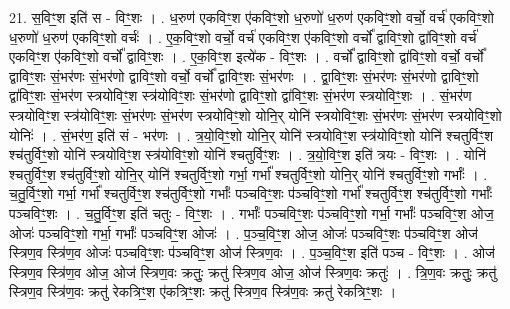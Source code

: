 \documentclass[17pt]{extarticle}
\begin{document}
21. स॒विꣳ॒॒श इति॑ स - विꣳ॒॒शः । . ध॒रुण॑ एकविꣳ॒॒श ए॑कविꣳ॒॒शो ध॒रुणो॑ ध॒रुण॑ एकविꣳ॒॒शो वर्चो॒ वर्च॑ एकविꣳ॒॒शो ध॒रुणो॑ ध॒रुण॑ एकविꣳ॒॒शो वर्चः॑ । . ए॒क॒विꣳ॒॒शो वर्चो॒ वर्च॑ एकविꣳ॒॒श ए॑कविꣳ॒॒शो वर्चो᳚ द्वाविꣳ॒॒शो द्वा॑विꣳ॒॒शो वर्च॑ एकविꣳ॒॒श ए॑कविꣳ॒॒शो वर्चो᳚ द्वाविꣳ॒॒शः । . ए॒क॒विꣳ॒॒श इत्ये॑क - विꣳ॒॒शः । . वर्चो᳚ द्वाविꣳ॒॒शो द्वा॑विꣳ॒॒शो वर्चो॒ वर्चो᳚ द्वाविꣳ॒॒शः सं॒भर॑णः सं॒भर॑णो द्वाविꣳ॒॒शो वर्चो॒ वर्चो᳚ द्वाविꣳ॒॒शः सं॒भर॑णः । . द्वा॒विꣳ॒॒शः सं॒भर॑णः सं॒भर॑णो द्वाविꣳ॒॒शो द्वा॑विꣳ॒॒शः सं॒भर॑ण स्त्रयोविꣳ॒॒श स्त्र॑योविꣳ॒॒शः सं॒भर॑णो द्वाविꣳ॒॒शो द्वा॑विꣳ॒॒शः सं॒भर॑ण स्त्रयोविꣳ॒॒शः । . सं॒भर॑ण स्त्रयोविꣳ॒॒श स्त्र॑योविꣳ॒॒शः सं॒भर॑णः सं॒भर॑ण स्त्रयोविꣳ॒॒शो योनि॒र् योनि॑ स्त्रयोविꣳ॒॒शः सं॒भर॑णः सं॒भर॑ण स्त्रयोविꣳ॒॒शो योनिः॑ । . सं॒भर॑ण॒ इति॑ सं - भर॑णः । . त्र॒यो॒विꣳ॒॒शो योनि॒र् योनि॑ स्त्रयोविꣳ॒॒श स्त्र॑योविꣳ॒॒शो योनि॑ श्चतुर्विꣳ॒॒श श्च॑तुर्विꣳ॒॒शो योनि॑ स्त्रयोविꣳ॒॒श स्त्र॑योविꣳ॒॒शो योनि॑ श्चतुर्विꣳ॒॒शः । . त्र॒यो॒विꣳ॒॒श इति॑ त्रयः - विꣳ॒॒शः । . योनि॑ श्चतुर्विꣳ॒॒श श्च॑तुर्विꣳ॒॒शो योनि॒र् योनि॑ श्चतुर्विꣳ॒॒शो गर्भा॒ गर्भा᳚ श्चतुर्विꣳ॒॒शो योनि॒र् योनि॑ श्चतुर्विꣳ॒॒शो गर्भाः᳚ । . च॒तु॒र्विꣳ॒॒शो गर्भा॒ गर्भा᳚ श्चतुर्विꣳ॒॒श श्च॑तुर्विꣳ॒॒शो गर्भाः᳚ पञ्चविꣳ॒॒शः प॑ञ्चविꣳ॒॒शो गर्भा᳚ श्चतुर्विꣳ॒॒श श्च॑तुर्विꣳ॒॒शो गर्भाः᳚ पञ्चविꣳ॒॒शः । . च॒तु॒र्विꣳ॒॒श इति॑ चतुः - विꣳ॒॒शः । . गर्भाः᳚ पञ्चविꣳ॒॒शः प॑ञ्चविꣳ॒॒शो गर्भा॒ गर्भाः᳚ पञ्चविꣳ॒॒श ओज॒ ओजः॑ पञ्चविꣳ॒॒शो गर्भा॒ गर्भाः᳚ पञ्चविꣳ॒॒श ओजः॑ । . प॒ञ्च॒विꣳ॒॒श ओज॒ ओजः॑ पञ्चविꣳ॒॒शः प॑ञ्चविꣳ॒॒श ओज॑ स्त्रिण॒व स्त्रि॑ण॒व ओजः॑ पञ्चविꣳ॒॒शः प॑ञ्चविꣳ॒॒श ओज॑ स्त्रिण॒वः । . प॒ञ्च॒विꣳ॒॒श इति॑ पञ्च - विꣳ॒॒शः । . ओज॑ स्त्रिण॒व स्त्रि॑ण॒व ओज॒ ओज॑ स्त्रिण॒वः क्रतुः॒ क्रतु॑ स्त्रिण॒व ओज॒ ओज॑ स्त्रिण॒वः क्रतुः॑ । . त्रि॒ण॒वः क्रतुः॒ क्रतु॑ स्त्रिण॒व स्त्रि॑ण॒वः क्रतु॑ रेकत्रिꣳ॒॒श ए॑कत्रिꣳ॒॒शः क्रतु॑ स्त्रिण॒व स्त्रि॑ण॒वः क्रतु॑ रेकत्रिꣳ॒॒शः । \newline
\end{document}
